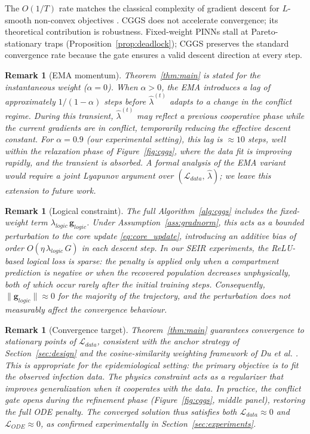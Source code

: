 \documentclass[11pt]{article}
\newtheorem{remark}[thm]{Remark}
\begin{document}
The $O(1/T)$ rate matches the classical complexity of gradient descent for $L$-smooth non-convex objectives \cite{ghadimi2013stochastic}. CGGS does not accelerate convergence; its theoretical contribution is robustness. Fixed-weight PINNs stall at Pareto-stationary traps (Proposition~\ref{prop:deadlock}); CGGS preserves the standard convergence rate because the gate ensures a valid descent direction at every step.

\begin{remark}[EMA momentum]\label{rem:ema}
Theorem~\ref{thm:main} is stated for the instantaneous weight ($\alpha = 0$). When $\alpha > 0$, the EMA introduces a lag of approximately $1/(1-\alpha)$ steps before $\hat{\lambda}^{(t)}$ adapts to a change in the conflict regime. During this transient, $\hat{\lambda}^{(t)}$ may reflect a previous cooperative phase while the current gradients are in conflict, temporarily reducing the effective descent constant. For $\alpha = 0.9$ (our experimental setting), this lag is $\approx 10$ steps, well within the relaxation phase of Figure~\ref{fig:cggs}, where the data fit is improving rapidly, and the transient is absorbed. A formal analysis of the EMA variant would require a joint Lyapunov argument over $(\mathcal{L}_{data},\, \hat{\lambda})$; we leave this extension to future work.
\end{remark}

\begin{remark}[Logical constraint]\label{rem:logic}
The full Algorithm~\ref{alg:cggs} includes the fixed-weight term $\lambda_{logic}\, \mathbf{g}_{logic}$. Under Assumption~\ref{ass:gradnorm}, this acts as a bounded perturbation to the core update \eqref{eq:core_update}, introducing an additive bias of order $O(\eta\,\lambda_{logic}\, G)$ in each descent step. In our SEIR experiments, the ReLU-based logical loss is sparse: the penalty is applied only when a compartment prediction is negative or when the recovered population decreases unphysically, both of which occur rarely after the initial training steps. Consequently, $\|\mathbf{g}_{logic}\| \approx 0$ for the majority of the trajectory, and the perturbation does not measurably affect the convergence behaviour.
\end{remark}

\begin{remark}[Convergence target]
Theorem~\ref{thm:main} guarantees convergence to stationary points of $\mathcal{L}_{data}$, consistent with the anchor strategy of Section~\ref{sec:design} and the cosine-similarity weighting framework of Du et al. \cite{du2018adapting}. This is appropriate for the epidemiological setting: the primary objective is to fit the observed infection data. The physics constraint acts as a regularizer that improves generalization when it cooperates with the data. In practice, the conflict gate opens during the refinement phase (Figure~\ref{fig:cggs}, middle panel), restoring the full ODE penalty. The converged solution thus satisfies both $\mathcal{L}_{data} \approx 0$ and $\mathcal{L}_{ODE} \approx 0$, as confirmed experimentally in Section~\ref{sec:experiments}.
\end{remark}
\end{document}
